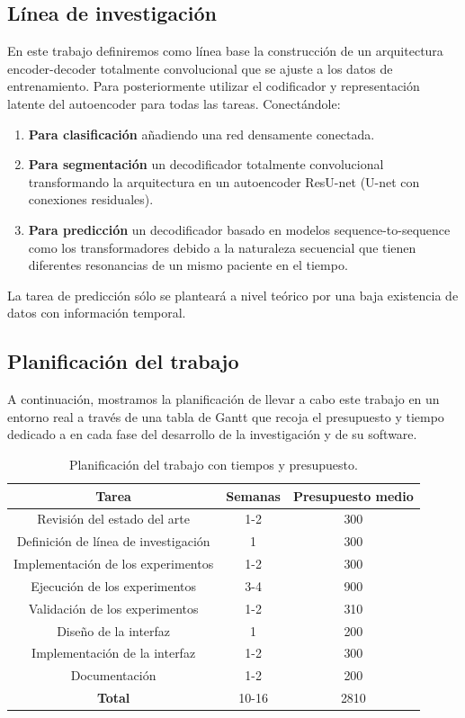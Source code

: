 \subsection{Línea de investigación}

 En este trabajo definiremos como línea base la construcción de un arquitectura encoder-decoder totalmente convolucional que se ajuste a los datos de entrenamiento. Para posteriormente utilizar el codificador y representación latente del autoencoder para todas las tareas. Conectándole:
 
 \begin{enumerate}
 	\item \textbf{Para clasificación} añadiendo una red densamente conectada. 
 	\item \textbf{Para segmentación}  un decodificador totalmente convolucional transformando la arquitectura en un autoencoder ResU-net (U-net con conexiones residuales).
 	\item \textbf{Para predicción} un decodificador basado en modelos sequence-to-sequence como los transformadores debido a la naturaleza secuencial que tienen diferentes resonancias de un mismo paciente en el tiempo.
 	
 \end{enumerate}
 
 La tarea de predicción sólo se planteará a nivel teórico por una baja existencia de datos con información temporal. 
 
\subsection{Planificación del trabajo}

A continuación, mostramos la planificación de llevar a cabo este trabajo en un entorno real a través de una tabla de Gantt que recoja el presupuesto y tiempo dedicado a en cada fase del desarrollo de la investigación y de su software.

\begin{table}[H]
	\centering
	\begin{tabular}{|ccc|}
		\toprule
		\textbf{Tarea} & \textbf{Semanas} & \textbf{Presupuesto medio} \\
		\midrule
		Revisión del estado del arte & 1-2 & 300 \\
		Definición de línea de investigación & 1 & 300 \\
		Implementación de los experimentos & 1-2 & 300 \\
		Ejecución de los experimentos & 3-4 & 900 \\
		Validación de los experimentos & 1-2 & 310 \\
		Diseño de la interfaz & 1 & 200 \\
		Implementación de la interfaz & 1-2 & 300\\
		Documentación & 1-2 &  200 \\
		\hline
		\textbf{Total} & 10-16 &  2810 \\
		\bottomrule
	\end{tabular}
	\caption{Planificación del trabajo con tiempos y presupuesto.}
	\label{tabla:planificacion}
\end{table}

